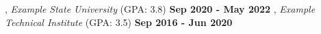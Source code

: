 ,
\textit{Example State University} (GPA: 3.8) \hfill {\bf Sep 2020 - May 2022} \newline
{}, \textit{Example Technical Institute} (GPA: 3.5) \hfill {\bf Sep 2016 - Jun 2020}
